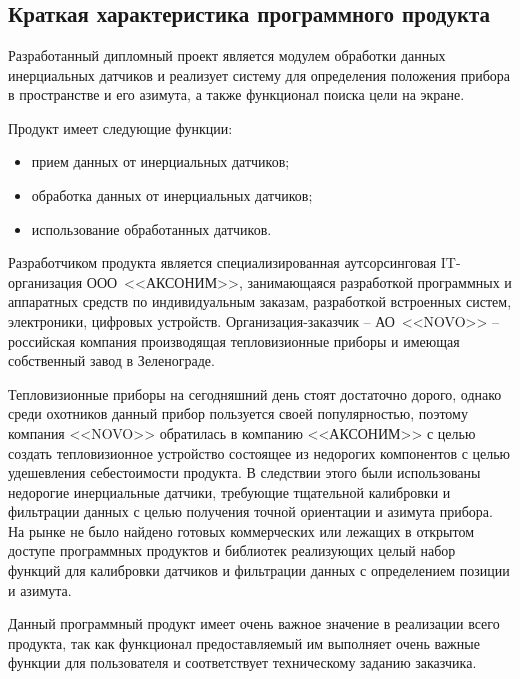 \section{\texorpdfstring{\MakeUppercase \economicalPartName}{\economicalPartName}}


\subsection{Краткая характеристика программного продукта}

Разработанный дипломный проект является модулем обработки данных инерциальных датчиков
и реализует систему для определения положения прибора в пространстве и его азимута,
а также функционал поиска цели на экране.

Продукт имеет следующие функции:
\begin{itemize}
  \item прием данных от инерциальных датчиков;
  \item обработка данных от инерциальных датчиков;
  \item использование обработанных датчиков.
\end{itemize}

Разработчиком продукта является специализированная аутсорсинговая IT-организация
ООО~<<АКСОНИМ>>, занимающаяся разработкой программных и аппаратных средств
по индивидуальным заказам, разработкой встроенных систем, электроники,
цифровых устройств. Организация-заказчик -- АО~<<NOVO>> --
российская компания производящая тепловизионные приборы и имеющая собственный завод в Зеленограде.

Тепловизионные приборы на сегодняшний день стоят достаточно дорого, однако среди охотников данный прибор пользуется 
своей популярностью, поэтому компания <<NOVO>> обратилась в компанию <<АКСОНИМ>> с целью создать тепловизионное устройство
состоящее из недорогих компонентов с целью удешевления себестоимости продукта. В следствии этого были использованы недорогие
инерциальные датчики, требующие тщательной калибровки и фильтрации данных с целью получения точной ориентации и азимута прибора.
На рынке не было найдено готовых коммерческих или лежащих в открытом доступе программных продуктов и библиотек реализующих целый
набор функций для калибровки датчиков и фильтрации данных с определением позиции и азимута.

Данный программный продукт имеет очень важное значение в реализации всего продукта, так как функционал предоставляемый им
выполняет очень важные функции для пользователя и соответствует техническому заданию заказчика.

